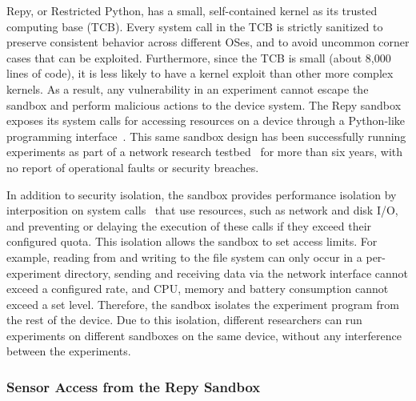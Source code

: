 Repy, or Restricted Python, has a small, self-contained kernel as its trusted 
computing base (TCB). %
Every system call in the TCB is strictly 
sanitized to preserve consistent behavior across different OSes, 
and to avoid uncommon corner cases that can be exploited. 
Furthermore, since the TCB is small (about 8,000 lines of code), it is 
less likely to have a kernel exploit than other more complex kernels. 
As a result, any vulnerability in an experiment 
cannot escape the sandbox and perform malicious actions to 
the device system. The Repy sandbox exposes its system calls for accessing resources on a device
through a Python-like programming interface~\cite{repyv2}. 
This same sandbox design has been successfully running experiments 
as part of a network research testbed~\cite{seattle} for more than six 
years, with no report of operational faults or security breaches. 

In addition to security isolation,
the sandbox provides performance isolation by
interposition on system calls~\cite{garfinkel2003traps} that 
use resources, such as network and disk I/O, and preventing 
or delaying the execution of these calls if they exceed 
their configured quota. 
This isolation allows the sandbox to set access limits. For example, 
reading from and writing to the file system can
only occur in a per-experiment directory, sending and receiving
data via the network interface cannot exceed a configured rate, and
CPU, memory and battery consumption cannot exceed a set level.
Therefore, the sandbox isolates the experiment program from 
the rest of the device. Due to this isolation, different researchers 
can run experiments on different sandboxes on the same device, 
without any interference between the experiments.

\subsubsection{Sensor Access from the Repy Sandbox}

